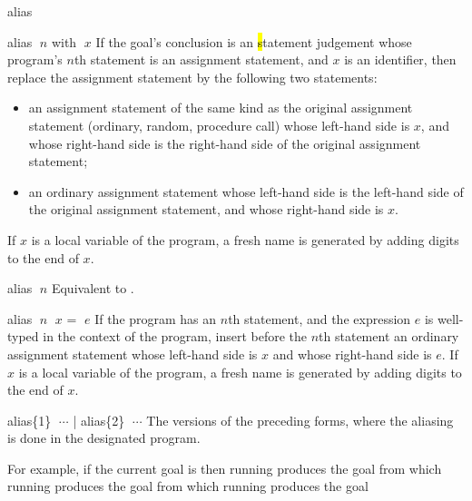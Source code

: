 \begin{tactic}{alias}
  \begin{tsyntax}{alias $\;n$ with $\;x$}
    If the goal's conclusion is an \hl statement judgement whose
    program's $n$th statement is an assignment statement, and $x$ is
    an identifier, then replace the assignment statement by the
    following two statements:
    \begin{itemize}
    \item an assignment statement of the same kind as the original
      assignment statement (ordinary, random, procedure call) whose
      left-hand side is $x$, and whose right-hand side is the
      right-hand side of the original assignment statement;

    \item an ordinary assignment statement whose left-hand side is
      the left-hand side of the original assignment statement,
      and whose right-hand side is $x$.
    \end{itemize}
    If $x$ is a local variable of the program, a fresh name is
    generated by adding digits to the end of $x$.
  \end{tsyntax}

  \begin{tsyntax}{alias $\;n$}
    Equivalent to .
  \end{tsyntax}

  \begin{tsyntax}{alias $\;n$ $\;x$ = $\;e$}
    If the program has an $n$th statement, and the expression $e$ is
    well-typed in the context of the program, insert before the $n$th
    statement an ordinary assignment statement whose left-hand side is
    $x$ and whose right-hand side is $e$.
    If $x$ is a local variable of the program, a fresh name is
    generated by adding digits to the end of $x$.
  \end{tsyntax}

  \begin{tsyntax}{alias\{1\} $\;\cdots$ | alias\{2\} $\;\cdots$}
    The \prhl versions of the preceding forms, where the aliasing
    is done in the designated program.
  \end{tsyntax}

  \bigskip For example, if the current goal is
   then running
   produces the
  goal 
  from which running
   produces the
  goal 
  from which running
   produces the
  goal 
\end{tactic}
